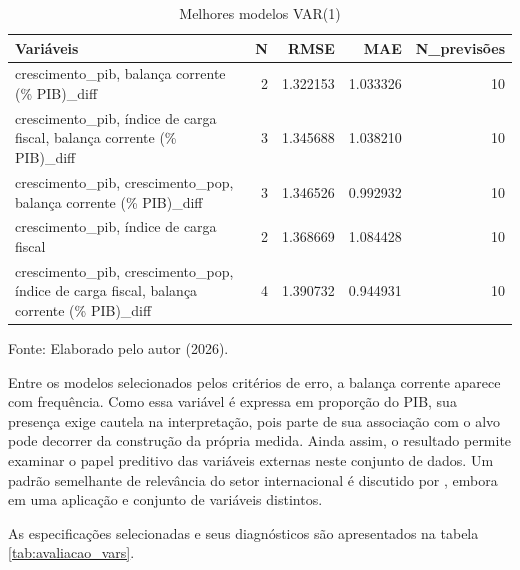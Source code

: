 \begin{table}[htbp]
	\centering
	\captionsetup{justification=centering}
	\caption{Melhores modelos VAR(1)}
	\label{tab:melhores_vars}
	
	\scriptsize
	\setlength{\tabcolsep}{2pt}
	\renewcommand{\arraystretch}{1.3}
	
	\begin{tabularx}{\textwidth}{>{\RaggedRight\arraybackslash}p{}rrrr}
		\toprule
		Variáveis & N & RMSE & MAE & N\_previsões \\
		\midrule
		crescimento\_pib, balança corrente (\% PIB)\_diff & 2 & 1.322153 & 1.033326 & 10 \\
		crescimento\_pib, índice de carga fiscal, balança corrente (\% PIB)\_diff & 3 & 1.345688 & 1.038210 & 10 \\
		crescimento\_pib, crescimento\_pop, balança corrente (\% PIB)\_diff & 3 & 1.346526 & 0.992932 & 10 \\
		crescimento\_pib, índice de carga fiscal & 2 & 1.368669 & 1.084428 & 10 \\
		crescimento\_pib, crescimento\_pop, índice de carga fiscal, balança corrente (\% PIB)\_diff & 4 & 1.390732 & 0.944931 & 10 \\
		\bottomrule
	\end{tabularx}
	
	
	\vspace{0.1cm}
	
	\small Fonte: Elaborado pelo autor (2026).
\end{table}

Entre os modelos selecionados pelos critérios de erro, a balança corrente aparece com frequência. Como essa variável é expressa em proporção do PIB, sua presença exige cautela na interpretação, pois parte de sua associação com o alvo pode decorrer da construção da própria medida. Ainda assim, o resultado permite examinar o papel preditivo das variáveis externas neste conjunto de dados. Um padrão semelhante de relevância do setor internacional é discutido por , embora em uma aplicação e conjunto de variáveis distintos.

As especificações selecionadas e seus diagnósticos são apresentados na tabela \ref{tab:avaliacao_vars}.


